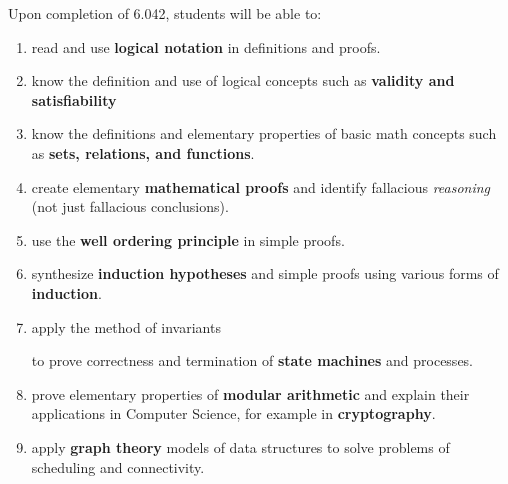 \documentclass[handout]{mcs}
\begin{document}
Upon completion of 6.042, students will be able to:
\begin{enumerate}

\item \label{basic} read and use \textbf{logical notation} in
  definitions and proofs. \hfill \brule{0.5in}

\item \label{logic} know the definition and use of logical
  concepts such as \textbf{validity and satisfiability} \hfill \brule{0.5in}

\item \label{sets} know the definitions and elementary properties of
  basic math concepts such as \textbf{sets, relations, and
    functions}. \hfill \brule{0.5in}


\item \label{proofs} create elementary \textbf{mathematical
proofs} and identify fallacious \emph{reasoning} (not just fallacious
conclusions).  \hfill \brule{0.5in}

\item \label{well ordering principle} use the \textbf{well ordering
  principle} in simple proofs.  \hfill \brule{0.5in}

\item \label{induction} synthesize \textbf{induction hypotheses} and
  simple proofs using various forms of \textbf{induction}.  \hfill
  \brule{0.5in}

\item \label{invariants} apply the method of invariants
\iffalse and well-ordering\fi
to prove correctness and termination of \textbf{state
    machines} and processes.  \hfill \brule{0.5in}

\iffalse

\item \label{structural induction} find simple proofs using
  \textbf{structural induction}.  \hfill \brule{0.5in}
\fi

\item \label{arithmetic} prove elementary properties of \textbf{modular
arithmetic} and explain their applications in Computer Science,
for example in \textbf{cryptography}.\hfill \brule{0.5in}

\item \label{graphs} apply \textbf{graph theory} models of data
  structures to solve problems of scheduling and connectivity.  \hfill
  \brule{0.5in}


\end{enumerate}
\end{document}
